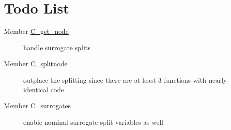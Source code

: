 \hypertarget{todo}{}\section{Todo List}\label{todo}
\label{todo__todo000002}
\hypertarget{todo__todo000002}{}
 \begin{description}
\item[Member \hyperlink{Predict_8c_dcd61d38c7c43d241d09a600b70fe3c5}{C\_\-get\_\-node} ]handle surrogate splits \end{description}


\label{todo__todo000001}
\hypertarget{todo__todo000001}{}
 \begin{description}
\item[Member \hyperlink{Predict_8c_daf8a0eb8790ebf14f0e265de164d50e}{C\_\-splitnode} ]outplace the splitting since there are at least 3 functions with nearly identical code \end{description}


\label{todo__todo000003}
\hypertarget{todo__todo000003}{}
 \begin{description}
\item[Member \hyperlink{SurrogateSplits_8c_fd8931db67339ca2bb679d8d38135275}{C\_\-surrogates} ]enable nominal surrogate split variables as well \end{description}
